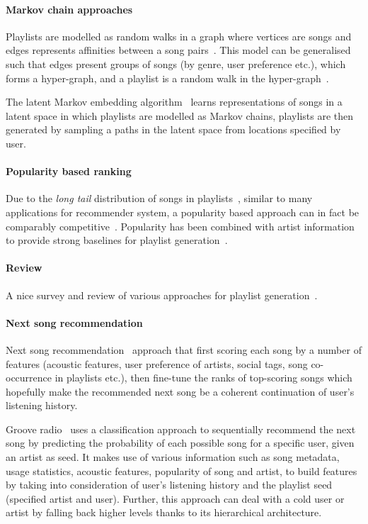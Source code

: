 \paragraph{Markov chain approaches}
Playlists are modelled as random walks in a graph where vertices are songs 
and edges represents affinities between a song pairs~\cite{mcfee2011natural}.
This model can be generalised such that edges present groups of songs (by genre, user preference etc.),
which forms a hyper-graph, and a playlist is a random walk in the hyper-graph~\cite{mcfee2012hypergraph}.

The latent Markov embedding algorithm~\cite{chen2012playlist}
learns representations of songs in a latent space in which playlists are modelled as Markov chains,
playlists are then generated by sampling a paths in the latent space from locations specified by user.

\paragraph{Popularity based ranking}
Due to the \emph{long tail} distribution of songs in playlists~\cite{aoscar2010music},
similar to many applications for recommender system, 
a popularity based approach can in fact be comparably competitive~\cite{cremonesi2010performance}.
Popularity has been combined with artist information to provide strong baselines 
for playlist generation~\cite{mcfee2012million,bonnin2013evaluating,bonnin2015automated}.

\paragraph{Review}
A nice survey and review of various approaches for playlist generation~\cite{bonnin2015automated}.


\paragraph{Next song recommendation}
Next song recommendation~\cite{jannach2015beyond} approach that first scoring each song by a number of features
(\eg acoustic features, user preference of artists, social tags, song co-occurrence in playlists etc.),
then fine-tune the ranks of top-scoring songs which hopefully make the recommended next song be a coherent continuation of user's listening history.

Groove radio~\cite{ben2017groove} uses a classification approach to sequentially recommend 
the next song by predicting the probability of each possible song for a specific user, given an artist as seed.
It makes use of various information such as song metadata, usage statistics, acoustic features, popularity of song and artist,
to build features by taking into consideration of user's listening history and the playlist seed (\ie specified artist and user).
Further, this approach can deal with a cold user or artist by falling back higher levels thanks to its hierarchical architecture.


